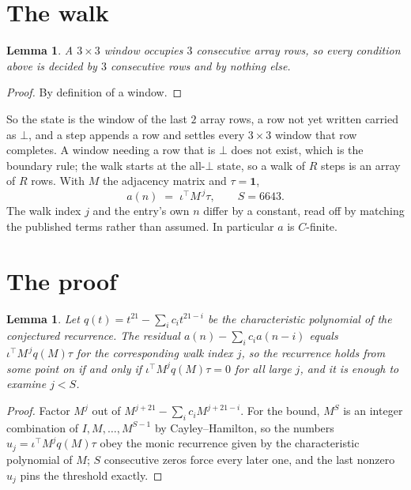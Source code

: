\documentclass[11pt,a4paper]{article}
\theoremstyle{plain}
\newtheorem{lemma}[theorem]{Lemma}
\theoremstyle{definition}
\begin{document}
\section{The walk}

\begin{lemma}\label{lem:win}
A $3\times3$ window occupies $3$ consecutive array rows, so every condition above is
decided by $3$ consecutive rows and by nothing else.
\end{lemma}

\begin{proof}
By definition of a window.
\end{proof}

So the state is the window of the last $2$ array rows, a row not yet written carried as
$\bot$, and a step appends a row and settles every $3\times3$ window that row completes. A
window needing a row that is $\bot$ does not exist, which is the boundary rule; the walk starts
at the all-$\bot$ state, so a walk of $R$ steps is an array of $R$ rows. With $M$ the adjacency
matrix and $\tau=\mathbf{1}$,
\[
a(n)\;=\;\iota^{\!\top}M^{\,j}\tau ,\qquad S=6643.
\]
The walk index $j$ and the entry's own $n$ differ by a constant, read off by matching the
published terms rather than assumed. In particular $a$ is $C$-finite.

\section{The proof}

\begin{lemma}\label{lem:crit}
Let $q(t)=t^{21}-\sum_i c_it^{21-i}$ be the characteristic polynomial of the
conjectured recurrence. The residual $a(n)-\sum_ic_ia(n-i)$ equals
$\iota^{\!\top}M^{\,j}q(M)\tau$ for the corresponding walk index $j$, so the recurrence
holds from some point on if and only if $\iota^{\!\top}M^{j}q(M)\tau=0$ for all large $j$,
and it is enough to examine $j<S$.
\end{lemma}

\begin{proof}
Factor $M^{j}$ out of $M^{j+21}-\sum_ic_iM^{j+21-i}$. For the bound, $M^{S}$
is an integer combination of $I,M,\dots,M^{S-1}$ by Cayley--Hamilton, so the numbers
$u_j=\iota^{\!\top}M^{j}q(M)\tau$ obey the monic recurrence given by the characteristic
polynomial of $M$; $S$ consecutive zeros force every later one, and the last nonzero $u_j$
pins the threshold exactly.
\end{proof}
\end{document}

